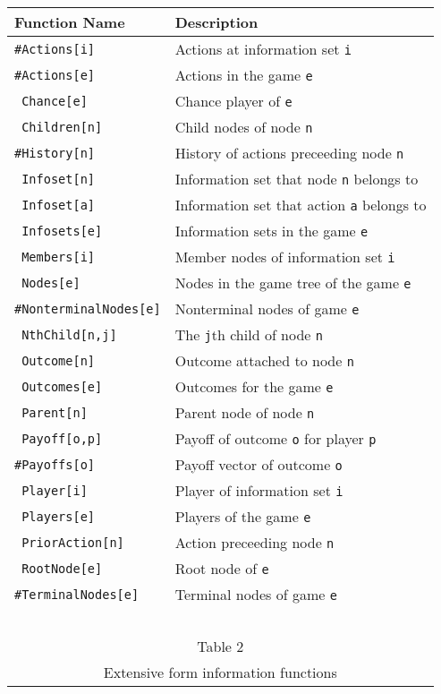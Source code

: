 \begin{table}[htp]
\begin{center}
\begin{tabular} {|l||l|} \hline
Function Name	& Description \\ 
\hline
\verb+#Actions[i]+ & Actions at information set \verb+i+ \\
\verb+#Actions[e]+ & Actions in the game \verb+e+ \\
\verb+ Chance[e]+ & Chance player of \verb+e+ \\
\verb+ Children[n]+ & Child nodes of node \verb+n+ \\
\verb+#History[n]+ & History of actions preceeding node \verb+n+ \\
\verb+ Infoset[n]+ & Information set that node \verb+n+ belongs to\\
\verb+ Infoset[a]+ & Information set that action \verb+a+ belongs to\\
\verb+ Infosets[e]+ & Information sets in the game \verb+e+\\
\verb+ Members[i]+ & Member nodes of information set \verb+i+\\
\verb+ Nodes[e]+ & Nodes in the game tree of the game \verb+e+\\
\verb+#NonterminalNodes[e]+ & Nonterminal nodes of game \verb+e+\\
\verb+ NthChild[n,j]+ & The \verb+j+th child of node \verb+n+ \\
\verb+ Outcome[n]+ & Outcome attached to node \verb+n+ \\
\verb+ Outcomes[e]+ & Outcomes for the game \verb+e+ \\
\verb+ Parent[n]+ & Parent node of node \verb+n+ \\
\verb+ Payoff[o,p]+ & Payoff  of outcome \verb+o+ for player \verb+p+ \\
\verb+#Payoffs[o]+ & Payoff vector of outcome \verb+o+ \\
\verb+ Player[i]+ & Player of information set \verb+i+ \\
\verb+ Players[e]+ & Players of the game \verb+e+ \\
\verb+ PriorAction[n]+ & Action preceeding node \verb+n+ \\
\verb+ RootNode[e]+ & Root node of \verb+e+ \\
\verb+#TerminalNodes[e]+ & Terminal nodes of game \verb+e+\\
\hline
\multicolumn{2}{c}{\ }\\
\multicolumn{2}{c}{Table 2}\\
\multicolumn{2}{c}{Extensive form information functions}\\
\end{tabular}
\end{center}
\end{table}
\medskip

